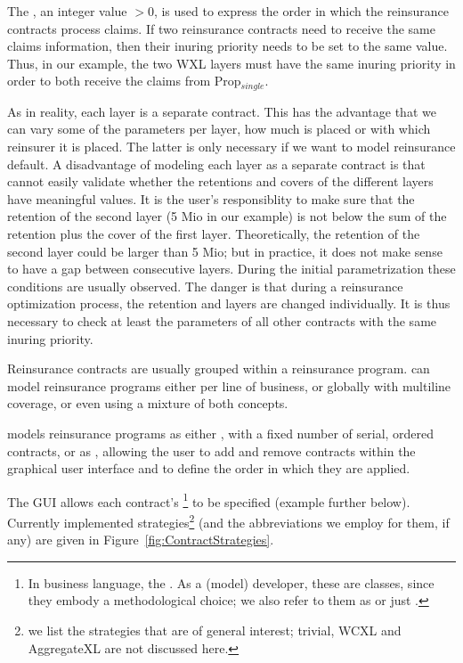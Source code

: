 The , an integer value $>0$, is used to express the order in which the reinsurance contracts process claims. If two reinsurance contracts need to receive the same claims information, then their inuring priority needs to be set to the same value. Thus, in our example, the two WXL layers must have the same inuring priority in order to both receive the claims from Prop$_{single}$. 

As in reality, each layer is a separate contract. This has the advantage that we can vary some of the parameters per layer, \eg how much is placed or with which reinsurer it is placed. The latter is only necessary if we want to model reinsurance default. A disadvantage of modeling each layer as a separate contract is that \PO{} cannot easily validate whether the retentions and covers of the different layers have meaningful values. It is the user's responsiblity to make sure that the retention of the second layer (5 Mio in our example) is not below the sum of the retention plus the cover of the first layer. Theoretically, the retention of the second layer could be larger than 5 Mio; but in practice, it does not make sense to have a gap between consecutive layers. During the initial parametrization these conditions are usually observed. The danger is that during a reinsurance optimization process, the retention and layers are changed individually. It is thus necessary to check at least the parameters of all other contracts with the same inuring priority.



Reinsurance contracts are usually grouped within a reinsurance program. \PO{} can model reinsurance programs either per line of business, or globally with multiline coverage, or even using a mixture of both concepts.

\PO{} models reinsurance programs as either , with a fixed number of serial, ordered contracts, or as , allowing the user to add and remove contracts within the graphical user interface and to define the order in which they are applied.

The GUI allows each contract's \footnote{In business language, the . As a \PO{} (model) developer, these are  classes, since they embody a methodological choice; we also refer to them as  or just .} to be specified (example further below). Currently implemented strategies\footnote{we list the strategies that are of general interest; trivial, WCXL and AggregateXL are not discussed here.} (and the abbreviations we employ for them, if any) are given in Figure~\ref{fig:ContractStrategies}.

